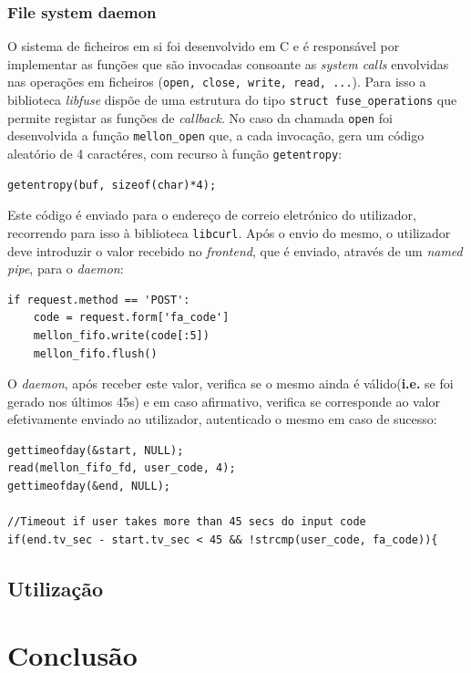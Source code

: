 \documentclass{article}
\begin{document}
\subsubsection{File system daemon}
O sistema de ficheiros em si foi desenvolvido em C e é responsável por implementar as funções que são invocadas consoante as \textit{system calls} envolvidas 
nas operações em ficheiros (\texttt{open, close, write, read, ...}). Para isso a biblioteca \textit{libfuse} dispõe de uma estrutura do tipo \texttt{struct
fuse\_operations} que permite registar as funções de \textit{callback}. No caso da chamada \texttt{open} foi desenvolvida a função \texttt{mellon\_open} que,
a cada invocação, gera um código aleatório de 4 caractéres, com recurso à função \texttt{getentropy}:
\begin{Verbatim}
getentropy(buf, sizeof(char)*4);
\end{Verbatim}
Este código é enviado para o endereço de correio eletrónico do utilizador, recorrendo para isso à biblioteca \texttt{libcurl}.
Após o envio do mesmo, o utilizador deve introduzir o valor recebido no \textit{frontend}, que é enviado, através de um \textit{named pipe}, para o 
\textit{daemon}:
\begin{Verbatim}
if request.method == 'POST':
    code = request.form['fa_code']
    mellon_fifo.write(code[:5])
    mellon_fifo.flush()
\end{Verbatim}
O \textit{daemon}, após receber este valor, verifica se o mesmo ainda é válido(\textbf{i.e.} se foi gerado nos últimos 45s) e em caso afirmativo, verifica
se corresponde ao valor efetivamente enviado ao utilizador, autenticado o mesmo em caso de sucesso:
\begin{Verbatim}
gettimeofday(&start, NULL);
read(mellon_fifo_fd, user_code, 4);
gettimeofday(&end, NULL);

//Timeout if user takes more than 45 secs do input code
if(end.tv_sec - start.tv_sec < 45 && !strcmp(user_code, fa_code)){
\end{Verbatim}
\subsection{Utilização}

\section{Conclusão}
\end{document}
